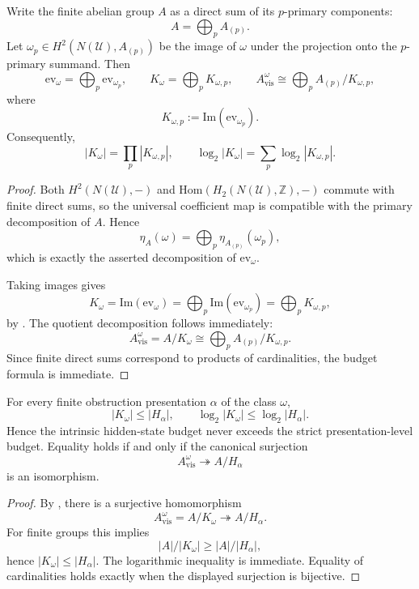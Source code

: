 \begin{theorem}\label{thm:intrinsic-prime-decomposition}
Write the finite abelian group $A$ as a direct sum of its $p$-primary components:
\[
A=\bigoplus_p A_{(p)}.
\]
Let $\omega_p\in H^2(N(\mathcal U),A_{(p)})$ be the image of $\omega$ under the projection onto the $p$-primary summand. Then
\[
\mathrm{ev}_{\omega}=\bigoplus_p \mathrm{ev}_{\omega_p},
\qquad
K_{\omega}=\bigoplus_p K_{\omega,p},
\qquad
A_{\mathrm{vis}}^{\omega}\cong \bigoplus_p A_{(p)}/K_{\omega,p},
\]
where
\[
K_{\omega,p}:=\mathrm{Im}(\mathrm{ev}_{\omega_p}).
\]
Consequently,
\[
|K_{\omega}|=\prod_p |K_{\omega,p}|,
\qquad
\log_2|K_{\omega}|=\sum_p \log_2|K_{\omega,p}|.
\]
\end{theorem}

\begin{proof}
Both $H^2(N(\mathcal U),-)$ and $\mathrm{Hom}(H_2(N(\mathcal U),\mathbb Z),-)$ commute with finite direct sums, so the universal coefficient map is compatible with the primary decomposition of $A$. Hence
\[
\eta_A(\omega)=\bigoplus_p \eta_{A_{(p)}}(\omega_p),
\]
which is exactly the asserted decomposition of $\mathrm{ev}_{\omega}$.

Taking images gives
\[
K_{\omega}
=
\mathrm{Im}(\mathrm{ev}_{\omega})
=
\bigoplus_p \mathrm{Im}(\mathrm{ev}_{\omega_p})
=
\bigoplus_p K_{\omega,p},
\]
by . The quotient decomposition follows immediately:
\[
A_{\mathrm{vis}}^{\omega}
=
A/K_{\omega}
\cong
\bigoplus_p A_{(p)}/K_{\omega,p}.
\]
Since finite direct sums correspond to products of cardinalities, the budget formula is immediate.
\end{proof}

\begin{corollary}\label{cor:strict-intrinsic-budget-comparison}
For every finite obstruction presentation $\alpha$ of the class $\omega$,
\[
|K_{\omega}|\le |H_\alpha|,
\qquad
\log_2|K_{\omega}|\le \log_2|H_\alpha|.
\]
Hence the intrinsic hidden-state budget never exceeds the strict presentation-level budget. Equality holds if and only if the canonical surjection
\[
A_{\mathrm{vis}}^{\omega}\twoheadrightarrow A/H_\alpha
\]
is an isomorphism.
\end{corollary}

\begin{proof}
By , there is a surjective homomorphism
\[
A_{\mathrm{vis}}^{\omega}=A/K_{\omega}\twoheadrightarrow A/H_\alpha.
\]
For finite groups this implies
\[
|A|/|K_{\omega}|\ge |A|/|H_\alpha|,
\]
hence $|K_{\omega}|\le |H_\alpha|$. The logarithmic inequality is immediate. Equality of cardinalities holds exactly when the displayed surjection is bijective.
\end{proof}

